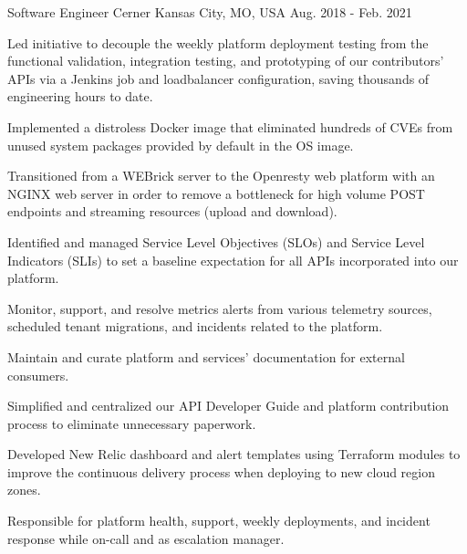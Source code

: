 \begin{cventries}
  \cventry
    {Software Engineer} %
    {Cerner} %
    {Kansas City, MO, USA} %
    {Aug. 2018 - Feb. 2021} %
    {
      \begin{cvitems} %
        \item {Led initiative to decouple the weekly platform deployment testing from the functional validation, integration testing, and prototyping of our contributors' APIs via a Jenkins job and loadbalancer configuration, saving thousands of engineering hours to date.}
        \item {Implemented a distroless Docker image that eliminated hundreds of CVEs from unused system packages provided by default in the OS image.}
        \item {Transitioned from a WEBrick server to the Openresty web platform with an NGINX web server in order to remove a bottleneck for high volume POST endpoints and streaming resources (upload and download).}
        \item {Identified and managed Service Level Objectives (SLOs) and Service Level Indicators (SLIs) to set a baseline expectation for all APIs incorporated into our platform.}
        \item {Monitor, support, and resolve metrics alerts from various telemetry sources, scheduled tenant migrations, and incidents related to the platform.}
        \item {Maintain and curate platform and services' documentation for external consumers.}
        \item {Simplified and centralized our API Developer Guide and platform contribution process to eliminate unnecessary paperwork.}
        \item {Developed New Relic dashboard and alert templates using Terraform modules to improve the continuous delivery process when deploying to new cloud region zones.}
        \item {Responsible for platform health, support, weekly deployments, and incident response while on-call and as escalation manager.}
      \end{cvitems}
    }
\end{cventries}

